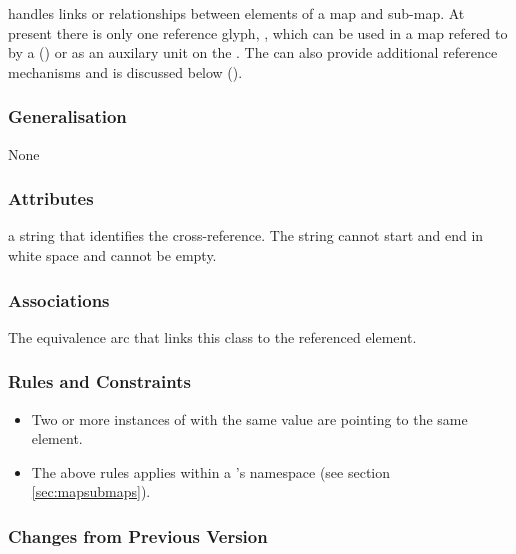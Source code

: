  handles links or relationships between elements of a
map and sub-map. At present there is only one reference glyph,
, which can be used in a map refered to by a 
() or as an auxilary unit on the . The
 can also provide additional reference mechanisms
and is discussed below ().

\subsubsection{Generalisation}

None

\subsubsection{Attributes}

\begin{attributes}
   a string that identifies the
  cross-reference. The string cannot start and end in white space and
  cannot be empty.
\end{attributes}

\subsubsection{Associations}

\begin{attributes}
   The
  equivalence arc that links this class to the referenced element.
\end{attributes}

\subsubsection{Rules and Constraints}

\begin{itemize}
\item  Two or more instances of  with the
  same  value are pointing to the same element.
\item The above rules applies within a \PDm's namespace (see section \ref{sec:mapsubmaps}).
\end{itemize}

\subsubsection{Changes from Previous Version}

